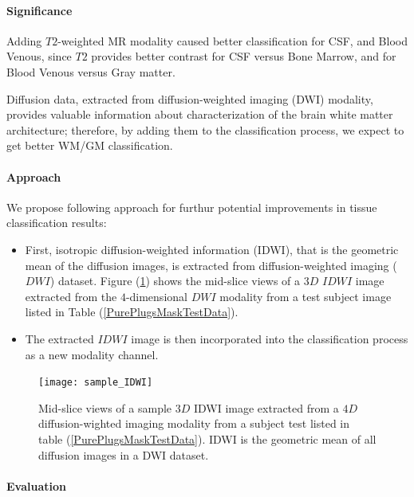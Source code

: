 \paragraph{Significance}

Adding $T2$-weighted MR modality caused better classification for CSF, and Blood Venous, since $T2$ provides better contrast for CSF versus Bone Marrow, and for Blood Venous versus Gray matter.

Diffusion data, extracted from diffusion-weighted imaging (DWI) modality, provides valuable information about characterization of the brain white matter architecture; therefore, by adding them to the classification process, we expect to get better WM/GM classification.

\paragraph{Approach}

We propose following approach for furthur potential improvements in tissue classification results:
\begin{itemize}
    \item First, isotropic diffusion-weighted information (IDWI), that is the geometric mean of the diffusion images, is extracted from diffusion-weighted imaging ($DWI$) dataset. Figure (\ref{fig:sample_IDWI}) shows the mid-slice views of a $3D$ $IDWI$ image extracted from the $4$-dimensional $DWI$ modality from a test subject image listed in Table (\ref{PurePlugsMaskTestData}).
    \item The extracted $IDWI$ image is then incorporated into the classification process as a new modality channel.
\end{itemize}

\begin{figure}
\centering
\texttt{[image: sample\_IDWI]}\
\centering
\caption{Mid-slice views of a sample $3D$ IDWI image extracted from a $4D$ diffusion-wighted imaging modality from a subject test listed in table (\ref{PurePlugsMaskTestData}). IDWI is the geometric mean of all diffusion images in a DWI dataset.} 
\label{fig:sample_IDWI}
\end{figure}

\paragraph{Evaluation}

